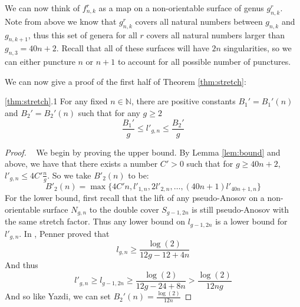 We can now think of $f^r_{n,k}$ as a map on a non-orientable surface of genus $g^r_{n,k}$. Note from above we know that $g^r_{n,k}$ covers all natural numbers between $g_{n,k}$ and $g_{n,k+1}$, thus this set of genera for all $r$ covers all natural numbers larger than $g_{n,3} = 40n + 2$. Recall that all of these surfaces will have $2n$ singularities, so we can either puncture $n$ or $n + 1$ to account for all possible number of punctures.

We can now give a proof of the first half of Theorem \ref{thm:stretch}:

\begin{manualtheorem}{\ref{thm:stretch}.1}
For any fixed $n \in \mathbb{N}$, there are positive constants $B_1' = B_1'(n)$ and $B_2' = B_2'(n)$ such that for any $g \geq 2$
$$\frac{B_1'}{g} \leq l'_{g,n} \leq \frac{B_2'}{g}$$
\end{manualtheorem}
\begin{proof}
    ~
    We begin by proving the upper bound. By Lemma \ref{lem:bound} and above, we have that there exists a number $C' > 0$ such that for $g \geq 40n + 2$, $l'_{g,n} \leq 4C'\frac{n}{g}$. So we take $B'_2(n)$ to be:
    $$B'_2(n) = \max\{4C'n, l'_{1,n}, 2l'_{2,n}, \dots, (40n + 1)l'_{40n+1,n}\}$$
    For the lower bound, first recall that the lift of any pseudo-Anosov on a non-orientable surface $N_{g,n}$ to the double cover $S_{g-1,2n}$ is still pseudo-Anosov with the same stretch factor. Thus any lower bound on $l_{g-1,2n}$ is a lower bound for $l'_{g,n}$. In \cite{penner1991bounds}, Penner proved that
    $$l_{g,n} \geq \frac{\log(2)}{12g - 12 + 4n}$$
    And thus $$l'_{g,n} \geq l_{g-1,2n} \geq \frac{\log(2)}{12g - 24 + 8n} > \frac{\log(2)}{12ng}$$
    And so like Yazdi, we can set $B_2'(n) = \frac{\log(2)}{12n}$
\end{proof}

